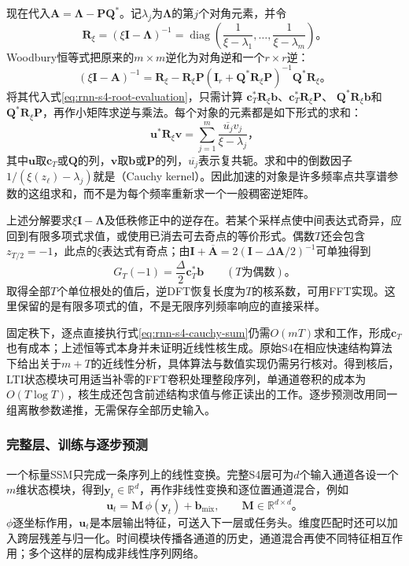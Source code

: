现在代入$\bm A=\bm\Lambda-\bm P\bm Q^*$。记$\lambda_j$为$\bm\Lambda$的第$j$个对角元素，并令
\[
  \bm R_\xi=(\xi\bm I-\bm\Lambda)^{-1}
    =\operatorname{diag}\!\left(
       \frac1{\xi-\lambda_1},\ldots,\frac1{\xi-\lambda_m}\right)\text{。}
\]
Woodbury恒等式把原来的$m\times m$逆化为对角逆和一个$r\times r$逆：
\begin{equation}
  (\xi\bm I-\bm A)^{-1}
    =\bm R_\xi-\bm R_\xi\bm P
       (\bm I_r+\bm Q^*\bm R_\xi\bm P)^{-1}
       \bm Q^*\bm R_\xi\text{。}
  \label{eq:rnn-s4-woodbury}
\end{equation}
将其代入式\eqref{eq:rnn-s4-root-evaluation}，只需计算
$\bm c_T^*\bm R_\xi\bm b$、$\bm c_T^*\bm R_\xi\bm P$、
$\bm Q^*\bm R_\xi\bm b$和$\bm Q^*\bm R_\xi\bm P$，再作小矩阵求逆与乘法。每个对象的元素都是如下形式的求和：
\begin{equation}
  \bm u^*\bm R_\xi\bm v
    =\sum_{j=1}^{m}\frac{\overline{u_j}v_j}{\xi-\lambda_j}\text{，}
  \label{eq:rnn-s4-cauchy-sum}
\end{equation}
其中$\bm u$取$\bm c_T$或$\bm Q$的列，$\bm v$取$\bm b$或$\bm P$的列，$\overline{u_j}$表示复共轭。求和中的倒数因子$1/(\xi(z_\ell)-\lambda_j)$就是（Cauchy kernel）。因此加速的对象是许多频率点共享谱参数的这组求和，而不是为每个频率重新求一个一般稠密逆矩阵。

上述分解要求$\xi\bm I-\bm\Lambda$及低秩修正中的逆存在。若某个采样点使中间表达式奇异，应回到有限多项式求值，或使用已消去可去奇点的等价形式。偶数$T$还会包含$z_{T/2}=-1$，此点的$\xi$表达式有奇点；由$\bm I+\overline{\bm A}=2(\bm I-\Delta\bm A/2)^{-1}$可单独得到
\[
  G_T(-1)=\frac{\Delta}{2}\bm c_T^*\bm b
  \qquad(T\text{为偶数})\text{。}
\]
取得全部$T$个单位根处的值后，逆DFT恢复长度为$T$的核系数，可用FFT实现。这里保留的是有限多项式的值，不是无限序列频率响应的直接采样。

固定秩下，逐点直接执行式\eqref{eq:rnn-s4-cauchy-sum}仍需$O(mT)$求和工作，形成$\bm c_T$也有成本；上述恒等式本身并未证明近线性核生成。原始S4在相应快速结构算法下给出关于$m+T$的近线性分析，具体算法与数值实现仍需另行核对。得到核后，LTI状态模块可用适当补零的FFT卷积处理整段序列，单通道卷积的成本为$O(T\log T)$，核生成还包含前述结构求值与修正读出的工作。逐步预测改用同一组离散参数递推，无需保存全部历史输入。

\subsubsection{完整层、训练与逐步预测}
\label{sec:rnn-s4-architecture}

一个标量SSM只完成一条序列上的线性变换。完整S4层可为$d$个输入通道各设一个$m$维状态模块，得到$\bm y_t\in\mathbb R^d$，再作非线性变换和逐位置通道混合，例如
\begin{equation}
  \bm u_t=\bm M\,\phi(\bm y_t)+\bm b_{\mathrm{mix}},
  \qquad\bm M\in\mathbb R^{d\times d}\text{。}
  \label{eq:rnn-s4-channel-layer}
\end{equation}
$\phi$逐坐标作用，$\bm u_t$是本层输出特征，可送入下一层或任务头。维度匹配时还可以加入跨层残差与归一化。时间模块传播各通道的历史，通道混合再使不同特征相互作用；多个这样的层构成非线性序列网络。

